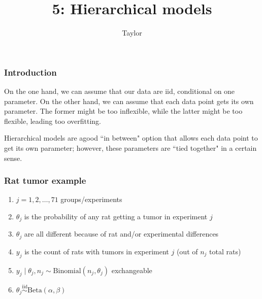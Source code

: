 \documentclass{beamer}
\title["5"]{5: Hierarchical models}
\author{Taylor}
\institute[UVA] 
{
University of Virginia \\
\medskip
\textit{} 
}
\date{}
\begin{document}

\begin{frame}
\titlepage 
\end{frame}

\begin{frame}
\frametitle{Introduction}

On the one hand, we can assume that our data are iid, conditional on one parameter. On the other hand, we can assume that each data point gets its own parameter. The former might be too inflexible, while the latter might be too flexible, leading too overfitting.
\newline

Hierarchical models are agood ``in between" option that allows each data point to get its own parameter; however, these parameters are ``tied together" in a certain sense.

\end{frame}

\begin{frame}
\frametitle{Rat tumor example}

\begin{enumerate}
\item $j=1,2,\ldots,71$ groups/experiments
\item $\theta_j$ is the probability of any rat getting a tumor in experiment $j$
\item $\theta_j$ are all different because of rat and/or experimental differences
\item $y_j$ is the count of rats with tumors in experiment $j$ (out of $n_j$ total rats)
\item $y_j \mid \theta_j, n_j \sim \text{Binomial}(n_j, \theta_j)$ exchangeable
\item $\theta_j \overset{\text{iid}}{\sim} \text{Beta}(\alpha,\beta)$ 
\end{enumerate}

\end{frame}
\end{document}
